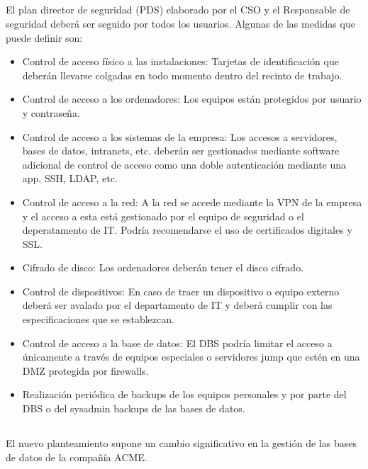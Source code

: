 \documentclass[10pt,a4paper]{article}
\begin{document}
\subsection{}
El plan director de seguridad (PDS) elaborado por el CSO y el Responsable de seguridad deberá ser seguido por todos los usuarios. Algunas de las medidas que puede definir son:
\begin{itemize}
\item Control de acceso físico a las instalaciones: Tarjetas de identificación que deberán llevarse colgadas en todo momento dentro del recinto de trabajo.
\item Control de acceso a los ordenadores: Los equipos están protegidos por usuario y contraseña.
\item Control de acceso a los sistemas de la empresa: Los accesos a servidores, bases de datos, intranets, etc. deberán ser gestionados mediante software adicional de control de acceso como una doble autenticación mediante una app, SSH, LDAP, etc.
\item Control de acceso a la red: A la red se accede mediante la VPN de la empresa y el acceso a esta está gestionado por el equipo de seguridad o el deperatamento de IT. Podría recomendarse el uso de certificados digitales y SSL.
\item Cifrado de disco: Los ordenadores deberán tener el disco cifrado.
\item Control de dispositivos: En caso de traer un dispositivo o equipo externo deberá ser avalado por el departamento de IT y deberá cumplir con las especificaciones que se establezcan.
\item Control de acceso a la base de datos: El DBS podría limitar el acceso a únicamente a través de equipos especiales o servidores jump que estén en una DMZ protegida por firewalls.
\item Realización periódica de backups de los equipos personales y por parte del DBS o del sysadmin backups de las bases de datos.
\end{itemize}

\subsection{}
\subsubsection{}
El nuevo planteamiento supone un cambio significativo en la gestión de las bases de datos de la compañía ACME.\\
\end{document}
